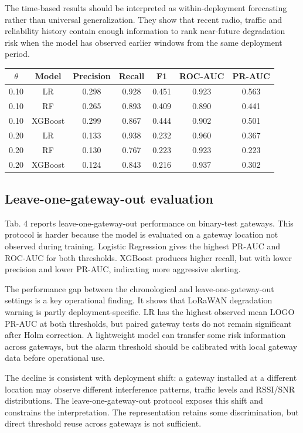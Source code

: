 \documentclass{jot}
\begin{document}
The time-based results should be interpreted as within-deployment forecasting rather than universal generalization. They show that recent radio, traffic and reliability history contain enough information to rank near-future degradation risk when the model has observed earlier windows from the same deployment period.

\begin{table}[t]
\centering
\begin{tabular}{@{}ccccccc@{}}
\toprule
$\theta$ & Model & Precision & Recall & F1 & ROC-AUC & PR-AUC \\
\midrule
0.10 & LR & 0.298 & 0.928 & 0.451 & 0.923 & 0.563 \\
0.10 & RF & 0.265 & 0.893 & 0.409 & 0.890 & 0.441 \\
0.10 & XGBoost & 0.299 & 0.867 & 0.444 & 0.902 & 0.501 \\
0.20 & LR & 0.133 & 0.938 & 0.232 & 0.960 & 0.367 \\
0.20 & RF & 0.130 & 0.767 & 0.223 & 0.923 & 0.223 \\
0.20 & XGBoost & 0.124 & 0.843 & 0.216 & 0.937 & 0.302 \\
\bottomrule
\end{tabular}
\end{table}

\subsection{Leave-one-gateway-out evaluation}\label{s:4.2}
Tab. 4 reports leave-one-gateway-out performance on binary-test gateways. This protocol is harder because the model is evaluated on a gateway location not observed during training. Logistic Regression gives the highest PR-AUC and ROC-AUC for both thresholds. XGBoost produces higher recall, but with lower precision and lower PR-AUC, indicating more aggressive alerting.

The performance gap between the chronological and leave-one-gateway-out settings is a key operational finding. It shows that LoRaWAN degradation warning is partly deployment-specific. LR has the highest observed mean LOGO PR-AUC at both thresholds, but paired gateway tests do not remain significant after Holm correction. A lightweight model can transfer some risk information across gateways, but the alarm threshold should be calibrated with local gateway data before operational use.

The decline is consistent with deployment shift: a gateway installed at a different location may observe different interference patterns, traffic levels and RSSI/SNR distributions. The leave-one-gateway-out protocol exposes this shift and constrains the interpretation. The representation retains some discrimination, but direct threshold reuse across gateways is not sufficient.
\end{document}
